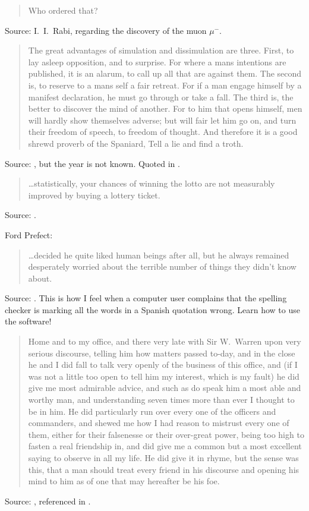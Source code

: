 \documentclass[a4paper]{article}
\begin{document}
\begin{quote}
	Who ordered that?
\end{quote}
Source: I.~I.~Rabi, regarding the discovery of the muon $\mu^-$.
\medskip

\begin{quote}
	The great advantages of simulation and dissimulation are
	three. First, to lay asleep opposition, and to surprise. For
	where a mans intentions are published, it is an alarum, to
	call up all that are against them. The second is, to reserve
	to a mans self a fair retreat. For if a man engage himself by
	a manifest declaration, he must go through or take a fall. The
	third is, the better to discover the mind of another. For to
	him that opens himself, men will hardly show themselves adverse;
	but will fair let him go on, and turn their freedom of speech,
	to freedom of thought. And therefore it is a good shrewd proverb
	of the Spaniard, Tell a lie and find a troth.
\end{quote}
Source: \citet{Bacon1626}, but the year is not known.  Quoted in
\citet[p.~93n31]{Dalton1964}.
\medskip

\begin{quote}
	\ldots statistically, your chances of winning the lotto are not
	measurably improved by buying a lottery ticket.
\end{quote}
Source: \citet{Doctorow2010a}.
\medskip

Ford Prefect:
\begin{quote}
	\ldots decided he quite liked human beings after all, but he
	always remained desperately worried about the terrible number
	of things they didn't know about.
\end{quote}
Source: \citet{Adams1979}.  This is how I feel when a computer user
complains that the spelling checker is marking all the words in a
Spanish quotation wrong.  Learn how to use the software!
\medskip

\begin{quote}
	Home and to my office, and there very late with Sir W.~Warren
	upon very serious discourse, telling him how matters passed
	to-day, and in the close he and I did fall to talk very openly
	of the business of this office, and (if I was not a little too
	open to tell him my interest, which is my fault) he did give
	me most admirable advice, and such as do speak him a most able
	and worthy man, and understanding seven times more than ever I
	thought to be in him. He did particularly run over every one of
	the officers and commanders, and shewed me how I had reason to
	mistrust every one of them, either for their falsenesse or their
	over-great power, being too high to fasten a real friendship in,
	and did give me a common but a most excellent saying to observe
	in all my life. He did give it in rhyme, but the sense was this,
	that a man should treat every friend in his discourse and opening
	his mind to him as of one that may hereafter be his foe.
\end{quote}
Source: \citet{Pepys1663}, referenced in \citet[p.~95n42]{Dalton1959}.
\medskip
\end{document}

